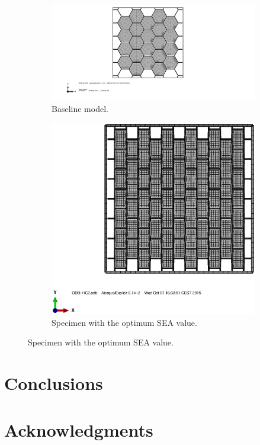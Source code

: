\documentclass[cmfonts]{witpress}
\begin{document}
\begin{figure}[htpb]
\begin{subfigure}[b]{.45\columnwidth}
   \includegraphics[width=\columnwidth]{figures/IMG/sc1.pdf}
    \caption{Baseline model.}
    \label{fig:back0}
\end{subfigure}
\qquad
\begin{subfigure}[b]{.45\columnwidth}
   \includegraphics[width=\columnwidth]{figures/IMG/top_view_foam.eps}
    \caption{Specimen with the optimum SEA value.}
    \label{fig:back5}
\end{subfigure}
\end{figure}




\section{Conclusions}
\section{Acknowledgments}




\end{document}
